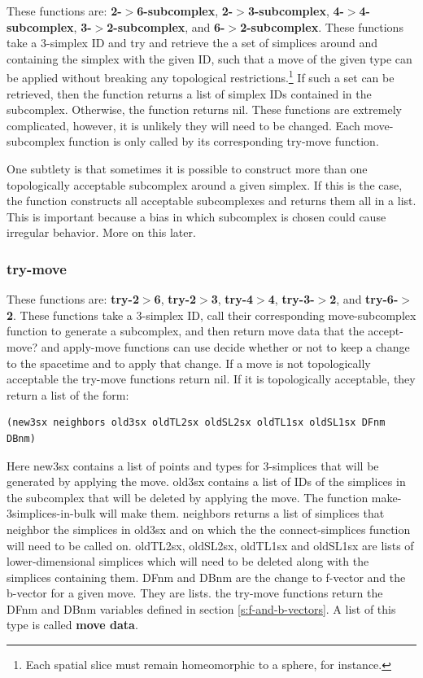 \message{ !name(programmers_guide.tex)}\documentclass[12pt]{article}
\begin{document}
These functions are: \textbf{2-$>$6-subcomplex},
\textbf{2-$>$3-subcomplex}, \textbf{4-$>$4-subcomplex},
\textbf{3-$>$2-subcomplex}, and \textbf{6-$>$2-subcomplex}. These
functions take a 3-simplex ID and try and retrieve the a set of
simplices around and containing the simplex with the given ID, such
that a move of the given type can be applied without breaking any
topological restrictions.\footnote{Each spatial slice must remain
  homeomorphic to a sphere, for instance.} If such a set can be
retrieved, then the function returns a list of simplex IDs contained
in the subcomplex. Otherwise, the function returns nil. These
functions are extremely complicated, however, it is unlikely they will
need to be changed. Each move-subcomplex function is only called by
its corresponding try-move function.

One subtlety is that sometimes it is possible to construct more than
one topologically acceptable subcomplex around a given simplex. If
this is the case, the function constructs all acceptable subcomplexes
and returns them all in a list. This is important because a bias in
which subcomplex is chosen could cause irregular behavior. More on
this later.

\subsubsection{try-move}

These functions are: \textbf{try-2$>$6}, \textbf{try-2$>$3},
\textbf{try-4$>$4}, \textbf{try-3-$>$2}, and
\textbf{try-6-$>$2}. These functions take a 3-simplex ID, call their
corresponding move-subcomplex function to generate a subcomplex, and
then return move data that the accept-move? and apply-move functions
can use decide whether or not to keep a change to the spacetime and to
apply that change. If a move is not topologically acceptable the
try-move functions return nil. If it is topologically acceptable, they
return a list of the form:
\begin{small}
\begin{lstlisting}
(new3sx neighbors old3sx oldTL2sx oldSL2sx oldTL1sx oldSL1sx DFnm DBnm)
\end{lstlisting}
\end{small}
Here new3sx contains a list of points and types for 3-simplices that
will be generated by applying the move. old3sx contains a list of IDs
of the simplices in the subcomplex that will be deleted by applying
the move. The function make-3simplices-in-bulk will make
them. neighbors returns a list of simplices that neighbor the
simplices in old3sx and on which the the connect-simplices function
will need to be called on. oldTL2sx, oldSL2sx, oldTL1sx and oldSL1sx
are lists of lower-dimensional simplices which will need to be deleted
along with the simplices containing them. DFnm and DBnm are the change
to f-vector and the b-vector for a given move. They are lists. the
try-move functions return the DFnm and DBnm variables defined in
section \ref{s:f-and-b-vectors}. A list of this type is called
\textbf{move data}.
\end{document}
